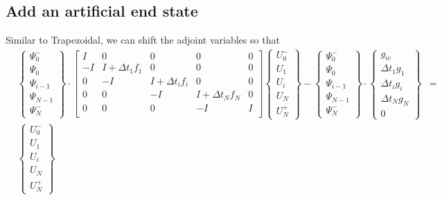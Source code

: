 \documentclass[10pt]{article}
\begin{document}
\subsection*{Add an artificial end state}

Similar to Trapezoidal, we can shift the adjoint variables so that
\begin{eqnarray}
&\left\{\begin{array}{c} \Psi_0^- \\ \Psi_0 \\ \Psi_{i-1} \\ 
\Psi_{N-1} \\ \Psi_N^- 
\end{array}\right\}
\cdot
\left[\begin{array}{ccccc} 
I & 0 & 0 & 0 & 0 \\
-I & I + \Delta t_1 f_1 & 0 & 0 & 0 \\
0 & -I & I + \Delta t_i f_i & 0 & 0 \\
0 & 0 & -I & I + \Delta t_N f_N & 0 \\
0 & 0 & 0 & -I & I \\
\end{array}\right] 
\left\{\begin{array}{c} 
U_0^- \\ U_1 \\ U_i \\ U_N \\ U_N^+ 
\end{array} \right\} -
\left\{\begin{array}{c} 
\Psi_0^- \\ \Psi_0 \\ \Psi_{i-1} \\ \Psi_{N-1} \\ \Psi_N^- 
\end{array}\right\}
\cdot
\left\{\begin{array}{c} 
g_{ic} \\ \Delta t_1 g_1 \\ \Delta t_i g_i \\ \Delta t_N g_N \\ 0 
\end{array} \right\} 
& =
\nonumber \\
&\left\{\begin{array}{c} 
U_0^- \\ U_1 \\ U_i \\ U_N \\ U_N^+ 
\end{array} \right\}

\end{eqnarray}
\end{document}

